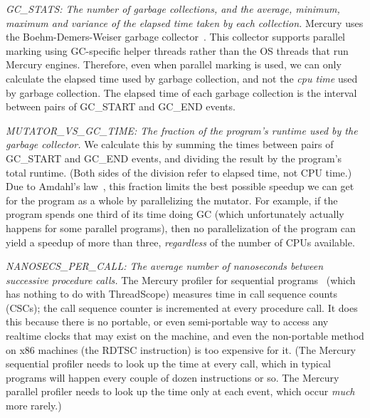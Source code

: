 
\emph{GC\_STATS: The number of garbage collections,
and the average, minimum, maximum and variance
of the elapsed time taken by each collection.}
Mercury uses the Boehm-Demers-Weiser garbage collector~\cite{boehm}.
This collector supports parallel marking using GC-specific helper threads
rather than the OS threads that run Mercury engines.
Therefore, even when parallel marking is used,
we can only calculate the elapsed time used by garbage collection,
and not the \emph{cpu time} used by garbage collection.
The elapsed time of each garbage collection
is the interval between pairs of GC\_START and GC\_END events.

\emph{MUTATOR\_VS\_GC\_TIME:
The fraction of the program's runtime used by the garbage collector.}
We calculate this by summing the times
between pairs of GC\_START and GC\_END events,
and dividing the result by the program's total runtime.
(Both sides of the division refer to elapsed time, not CPU time.)
Due to Amdahl's law~\cite{amdahl:1967:law},
this fraction limits the best possible speedup we can get
for the program as a whole by parallelizing the mutator.
For example, if the program spends one third of its time doing GC
(which unfortunately actually happens for some parallel programs),
then no parallelization of the program can yield a speedup of more than three,
\emph{regardless} of the number of CPUs available.

\emph{NANOSECS\_PER\_CALL:
The average number of nanoseconds between successive procedure calls.}
The Mercury profiler for sequential programs~\cite{conway:2001:mercury-deep}
(which has nothing to do with ThreadScope)
measures time in call sequence counts (CSCs);
the call sequence counter is incremented at every procedure call.
It does this because there is no portable, or even semi-portable way
to access any realtime clocks that may exist on the machine,
and even the non-portable method on x86 machines (the RDTSC instruction)
is too expensive for it.
(The Mercury sequential profiler needs to look up the time at every call,
which in typical programs will happen every couple of dozen instructions or so.
The Mercury parallel profiler needs to look up the time only at each event,
which occur \emph{much} more rarely.)


